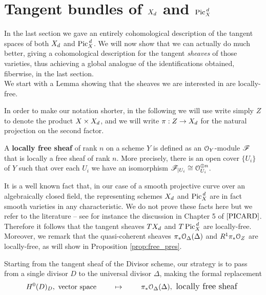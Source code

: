 \section{Tangent bundles of $X_d$ and $\operatorname{Pic}^{\,d}_X$ }
	In the last section we gave an entirely cohomological description of the tangent spaces of both $X_d$ and $\operatorname{Pic}^{\,d}_X$. We will now show that we can actually do much better, giving a cohomological description for the tangent \emph{sheaves} of those varieties, thus achieving a global analogue of the identifications obtained, fiberwise, in the last section. \\
	We start with a Lemma showing that the sheaves we are interested in are locally-free.

	\begin{notation}
		In order to make our notation shorter, in the following we will use write simply $Z$ to denote the product $X\times X_d$, and we will write $\pi:Z\to X_d$ for the natural projection on the second factor. 
	\end{notation}

	\begin{defi}
		A \textbf{locally free sheaf} of rank $n$ on a scheme $Y$ is defined as an $\mathcal{O}_Y$-module $\mathscr{F}$ that is locally a free sheaf of rank $n$. More precisely, there is an open cover $\{U_i\}$ of $Y$ such that over each $U_i$ we have an isomorphism $\mathscr{F}_{\mid U_i} \cong \mathcal{O}_{U_i}^{\oplus n}$.
	\end{defi}

	\begin{rema}\label{rema:smoothness}
		It is a well known fact that, in our case of a smooth projective curve over an algebraically closed field, the representing schemes $X_d$ and $\operatorname{Pic}^{\,d}_X$ are in fact smooth varieties in any characteristic. We do not prove these facts here but we refer to the literature -- see for instance the discussion in Chapter 5 of $\cite{PICARD}$. Therefore it follows that the tangent sheaves $TX_d$ and $T\operatorname{Pic}^{\,d}_X$ are locally-free.\\
		Moreover, we remark that the quasi-coherent sheaves $\pi_* \mathcal{O}_{\Delta}(\Delta)$ and $R^1\pi_*\mathcal{O}_Z$ are locally-free, as will show in Proposition \ref{prop:free_pres}.\\
	\end{rema}

	Starting from the tangent sheaf of the Divisor scheme, our strategy is to pass from a single divisor $D$ to the universal divisor $\Delta$, making the formal replacement 
	$$ H^0(D)_D, \text{ vector space } \qquad \large\mapsto \qquad \pi_* \mathcal{O}_{\Delta}(\Delta), \text{ locally free sheaf }$$
	
